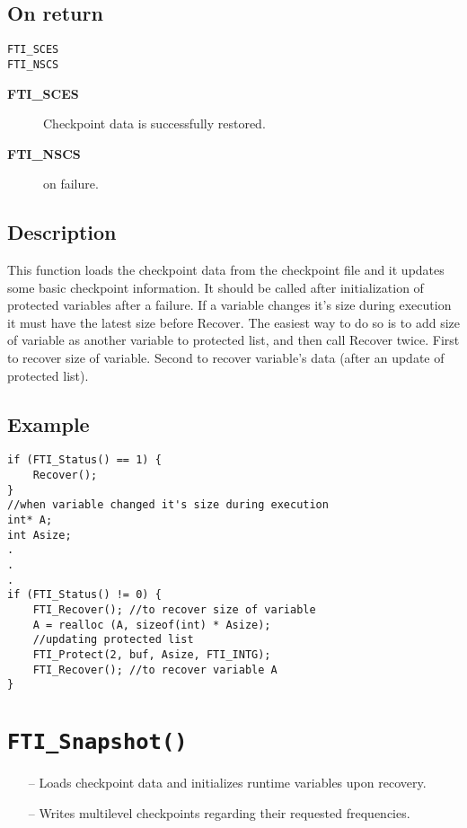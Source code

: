 \documentclass{refrep}
\begin{document}
\subsection*{On return}
\begin{lstlisting}[frame=single]
FTI_SCES
FTI_NSCS
\end{lstlisting}
\begin{description}
\item[\textbf{FTI\_SCES}] Checkpoint data is successfully restored.
\item[\textbf{FTI\_NSCS}] on failure.
\end{description}
\subsection*{Description}
This function loads the checkpoint data from the checkpoint file and it updates some basic checkpoint information. It should be called after initialization of protected variables after a failure. If a variable changes it's size during execution it must have the latest size before Recover. The easiest way to do so is to add size of variable as another variable to protected list, and then call Recover twice. First to recover size of variable. Second to recover variable's data (after an update of protected list).
\subsection*{Example}
\begin{center}
\begin{lstlisting}[frame=single]
if (FTI_Status() == 1) {
    Recover();
}
//when variable changed it's size during execution
int* A;
int Asize;
.
.
.
if (FTI_Status() != 0) {
    FTI_Recover(); //to recover size of variable
    A = realloc (A, sizeof(int) * Asize);
    //updating protected list
    FTI_Protect(2, buf, Asize, FTI_INTG);
    FTI_Recover(); //to recover variable A
}

\end{lstlisting}
\end{center}
\newpage
\section{\tt FTI\_Snapshot()}\label{sec:ftisnapshot}
\begin{framed}
\begin{itemize}
\item[--] Loads checkpoint data and initializes runtime variables upon recovery.
\item[--] Writes multilevel checkpoints regarding their requested frequencies.
\end{itemize}
\end{framed}
\end{document}

